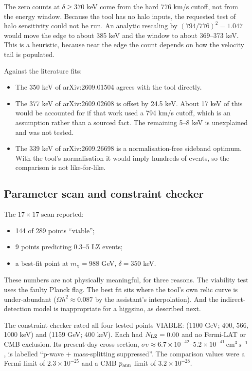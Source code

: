 \documentclass[11pt,a4paper]{article}
\begin{document}
The zero counts at $\delta \geq 370$ keV come from the hard 776 km/s cutoff, not from the energy window. Because the tool has no halo inputs, the requested test of halo sensitivity could not be run. An analytic rescaling by $(794/776)^2 = 1.047$ would move the edge to about 385 keV and the window to about 369--373 keV. This is a heuristic, because near the edge the count depends on how the velocity tail is populated.

Against the literature fits:
\begin{itemize}
\item The 350 keV of arXiv:2609.01504 agrees with the tool directly.
\item The 377 keV of arXiv:2609.02608 is offset by 24.5 keV. About 17 keV of this would be accounted for if that work used a 794 km/s cutoff, which is an assumption rather than a sourced fact. The remaining 5--8 keV is unexplained and was not tested.
\item The 339 keV of arXiv:2609.26698 is a normalisation-free sideband optimum. With the tool's normalisation it would imply hundreds of events, so the comparison is not like-for-like.
\end{itemize}

\subsection{Parameter scan and constraint checker}
The $17\times17$ scan reported:
\begin{itemize}
\item 144 of 289 points ``viable'';
\item 9 points predicting 0.3--5 LZ events;
\item a best-fit point at $m_\chi = 988$ GeV, $\delta = 350$ keV.
\end{itemize}
These numbers are not physically meaningful, for three reasons. The viability test uses the faulty Planck flag. The best fit sits where the tool's own relic curve is under-abundant ($\Omega h^2 \approx 0.087$ by the assistant's interpolation). And the indirect-detection model is inappropriate for a higgsino, as described next.

The constraint checker rated all four tested points VIABLE: (1100 GeV; 400, 566, 1000 keV) and (1159 GeV; 400 keV). Each had $N_{\rm LZ} = 0.00$ and no Fermi-LAT or CMB exclusion. Its present-day cross section, $\sigma v \approx 6.7\times10^{-42}$--$5.2\times10^{-41}\,\mathrm{cm^3\,s^{-1}}$, is labelled ``p-wave + mass-splitting suppressed''. The comparison values were a Fermi limit of $2.3\times10^{-25}$ and a CMB $p_{\rm ann}$ limit of $3.2\times10^{-28}$.
\end{document}
